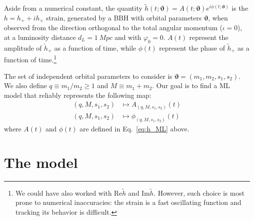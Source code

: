Aside from a numerical constant, the quantity ${\tilde{h}(t; \boldsymbol{\vartheta}) = A(t; \boldsymbol{\vartheta}) e^{i \phi(t; \boldsymbol{\vartheta})}}$ is the $h = h_+ +i h_\times$ strain, generated by a BBH with orbital parameters $\boldsymbol{\vartheta}$, when observed from the direction orthogonal to the total angular momentum ($\iota =0$), at a luminosity distance $d_L = \SI{1}{Mpc}$ and with $\varphi_0 =0$.
$A(t)$ represent the amplitude of $\tilde{h}_+$ as a function of time, while $\phi(t)$ represent the phase of $\tilde{h}_+$ as a function of time.\footnote{
We could have also worked with $\mathrm{Re}{\tilde{h}}$ and $\mathrm{Im}{\tilde{h}}$. However, such choice is most prone to numerical inaccuracies: the strain is a fast oscillating function and tracking its behavior is difficult.}

The set of independent orbital parameters to consider is $\boldsymbol{\vartheta} = (m_1, m_2, s_1, s_2)$.
We also define $q\equiv m_1/m_2\geq 1$ and $M\equiv m_1+m_2$. Our goal is to find
a ML model that reliably represents the following map:
\begin{align}
	(q, M, s_1, s_2) &\longmapsto A_{(q, M, s_1, s_2)}(t) \label{eq:objective_amp}\\
	(q, M, s_1, s_2) &\longmapsto \phi_{(q, M, s_1, s_2)}(t) \label{eq:objective_ph}
\end{align}
where $A(t)$ and $\phi(t)$ are defined in Eq.~\eqref{eq:h_ML} above.

\section{The model}
\label{sec: model}
%
